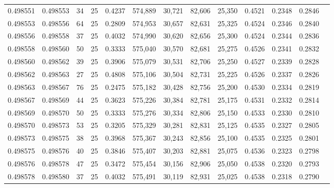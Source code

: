 \begin{tabular}{rrrrrrrrrrrrr}
0.498551 & 0.498553 &    34 &  25 &                                     0.4237 & 574,889 &  30,721 &  82,606 &  25,350 & 0.4521 & 0.2348 & 0.2846 \\
0.498553 & 0.498556 &    64 &  25 &                                     0.2809 & 574,953 &  30,657 &  82,631 &  25,325 & 0.4524 & 0.2346 & 0.2840 \\
0.498556 & 0.498558 &    37 &  25 &                                     0.4032 & 574,990 &  30,620 &  82,656 &  25,300 & 0.4524 & 0.2344 & 0.2836 \\
0.498558 & 0.498560 &    50 &  25 &                                     0.3333 & 575,040 &  30,570 &  82,681 &  25,275 & 0.4526 & 0.2341 & 0.2832 \\
0.498560 & 0.498562 &    39 &  25 &                                     0.3906 & 575,079 &  30,531 &  82,706 &  25,250 & 0.4527 & 0.2339 & 0.2828 \\
0.498562 & 0.498563 &    27 &  25 &                                     0.4808 & 575,106 &  30,504 &  82,731 &  25,225 & 0.4526 & 0.2337 & 0.2826 \\
0.498563 & 0.498567 &    76 &  25 &                                     0.2475 & 575,182 &  30,428 &  82,756 &  25,200 & 0.4530 & 0.2334 & 0.2819 \\
0.498567 & 0.498569 &    44 &  25 &                                     0.3623 & 575,226 &  30,384 &  82,781 &  25,175 & 0.4531 & 0.2332 & 0.2814 \\
0.498569 & 0.498570 &    50 &  25 &                                     0.3333 & 575,276 &  30,334 &  82,806 &  25,150 & 0.4533 & 0.2330 & 0.2810 \\
0.498570 & 0.498573 &    53 &  25 &                                     0.3205 & 575,329 &  30,281 &  82,831 &  25,125 & 0.4535 & 0.2327 & 0.2805 \\
0.498573 & 0.498575 &    38 &  25 &                                     0.3968 & 575,367 &  30,243 &  82,856 &  25,100 & 0.4535 & 0.2325 & 0.2801 \\
0.498575 & 0.498576 &    40 &  25 &                                     0.3846 & 575,407 &  30,203 &  82,881 &  25,075 & 0.4536 & 0.2323 & 0.2798 \\
0.498576 & 0.498578 &    47 &  25 &                                     0.3472 & 575,454 &  30,156 &  82,906 &  25,050 & 0.4538 & 0.2320 & 0.2793 \\
0.498578 & 0.498580 &    37 &  25 &                                     0.4032 & 575,491 &  30,119 &  82,931 &  25,025 & 0.4538 & 0.2318 & 0.2790 \\

\end{tabular}
